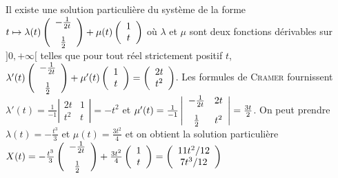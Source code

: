 {\begin{enumerate}
{Il existe une solution particulière du système de la forme $t\mapsto\lambda(t)\left(
\begin{array}{c}
- \frac{1}{2t}\\
\rule{0mm}{6mm} \frac{1}{2}
\end{array}
\right)
+\mu(t)\left(
\begin{array}{c}
1\\
t
\end{array}
\right)$ où $\lambda$ et $\mu$ sont deux fonctions dérivables sur $]0,+\infty[$ telles que pour tout réel strictement positif $t$, $\lambda'(t)\left(
\begin{array}{c}
- \frac{1}{2t}\\
\rule{0mm}{6mm} \frac{1}{2}
\end{array}
\right)
+\mu'(t)\left(
\begin{array}{c}
1\\
t
\end{array}
\right)=\left(
\begin{array}{c}
2t\\
t^2
\end{array}
\right)$. Les formules de \textsc{Cramer} fournissent $\lambda'(t)= \frac{1}{-1}\left|
\begin{array}{cc}
2t&1\\
t^2&t
\end{array}
\right|=-t^2$ et $\mu'(t)= \frac{1}{-1}\left|
\begin{array}{cc}
- \frac{1}{2t}&2t\\
\rule{0mm}{6mm} \frac{1}{2}&t^2
\end{array}
\right|= \frac{3t}{2}$. On peut prendre $\lambda(t)=- \frac{t^3}{3}$ et $\mu(t)= \frac{3t^2}{4}$ et on obtient la solution particulière $X(t)=- \frac{t^3}{3}\left(
\begin{array}{c}
- \frac{1}{2t}\\
\rule{0mm}{6mm} \frac{1}{2}
\end{array}
\right)
+ \frac{3t^2}{4}\left(
\begin{array}{c}
1\\
t
\end{array}
\right)=\left(
\begin{array}{c}
11t^2/12\\
7t^3/12
\end{array}
\right)$

}
\end{enumerate}}
